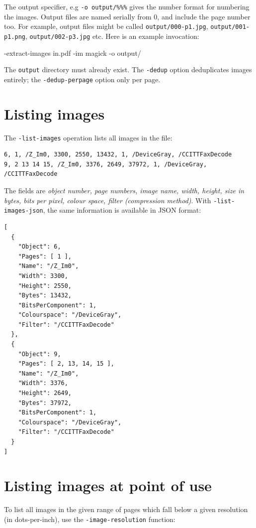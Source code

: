 \documentclass{book}
\begin{document}
The output specifier, e.g \verb!-o output/%%%! gives the number format for numbering the images. Output files are named serially from 0, and include the page number too. For example, output files might be called \texttt{output/000-p1.jpg}, \texttt{output/001-p1.png}, \texttt{output/002-p3.jpg} etc. Here is an example invocation:

  \begin{framed}
  \noindent\small\verb@cpdf -extract-images in.pdf -im magick -o output/%%%@
  \end{framed}

\noindent The \texttt{output} directory must already exist. The \texttt{-dedup} option deduplicates images entirely; the \texttt{-dedup-perpage} option only per page.

\section{Listing images}

The \texttt{-list-images} operation lists all images in the file:

  \begin{framed}
{\small\begin{verbatim}6, 1, /Z_Im0, 3300, 2550, 13432, 1, /DeviceGray, /CCITTFaxDecode
9, 2 13 14 15, /Z_Im0, 3376, 2649, 37972, 1, /DeviceGray, /CCITTFaxDecode\end{verbatim}}
  \end{framed}

\noindent The fields are \textit{object number, page numbers, image name, width, height, size in bytes, bits per pixel, colour space, filter (compression method)}. With \texttt{-list-images-json}, the same information is available in JSON format:

  \begin{framed}
{\small\begin{verbatim}[
  {
    "Object": 6,
    "Pages": [ 1 ],
    "Name": "/Z_Im0",
    "Width": 3300,
    "Height": 2550,
    "Bytes": 13432,
    "BitsPerComponent": 1,
    "Colourspace": "/DeviceGray",
    "Filter": "/CCITTFaxDecode"
  },
  {
    "Object": 9,
    "Pages": [ 2, 13, 14, 15 ],
    "Name": "/Z_Im0",
    "Width": 3376,
    "Height": 2649,
    "Bytes": 37972,
    "BitsPerComponent": 1,
    "Colourspace": "/DeviceGray",
    "Filter": "/CCITTFaxDecode"
  }
]\end{verbatim}}
  \end{framed}

  \section{Listing images at point of use}\label{imageres}
  To list all images in the given range of pages which fall below a given resolution (in dots-per-inch), use the \verb!-image-resolution! function:
\end{document}
